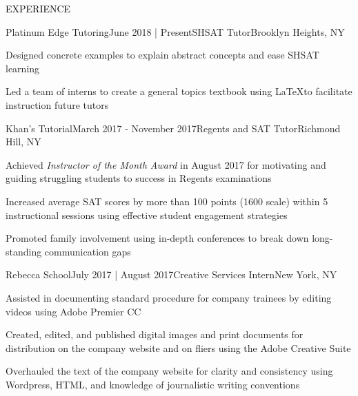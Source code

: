 \documentclass{resume} %
\renewenvironment{rSection}[1]{
\sectionskip
\textcolor{Black}{\MakeUppercase{#1}}
\sectionlineskip
\begin{list}{}{
\setlength{\leftmargin}{1.5em}
}
\item[]
}{
\end{list}
}
\begin{document}
\begin{rSection}{Experience}
  \begin{rSubsection}{Platinum Edge Tutoring}{June 2018 | Present}{SHSAT Tutor}{Brooklyn Heights, NY}
    \item Designed concrete examples to explain abstract concepts and ease SHSAT learning
    \item Led a team of interns to create a general topics textbook using \LaTeX \hspace{.7ex}to facilitate instruction future tutors 
  \end{rSubsection}
  \begin{rSubsection}{Khan's Tutorial}{March 2017 - November 2017}{Regents and SAT Tutor}{Richmond Hill, NY}
    \item Achieved {\em Instructor of the Month Award} in August 2017 for motivating and guiding struggling students to success in Regents examinations
    \item Increased average SAT scores by more than 100 points (1600 scale) within 5
      instructional sessions using effective student engagement strategies
    \item Promoted family involvement using in-depth conferences to break down long-standing communication gaps
  \end{rSubsection}

  \begin{rSubsection}{Rebecca School}{July 2017 | August 2017}{Creative Services Intern}{New York, NY}
    \item Assisted in documenting standard procedure for company trainees by editing videos using Adobe Premier CC %
    \item Created, edited, and published digital images and print documents for distribution on the company website and on fliers using the Adobe Creative Suite
    \item Overhauled the text of the company website for clarity and consistency using Wordpress, HTML, and knowledge of journalistic writing conventions
  \end{rSubsection}


\end{rSection}
\end{document}
